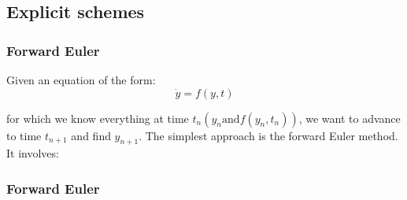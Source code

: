 \documentclass[notes]{beamer}
\begin{document}
\subsection{Explicit schemes}
\begin{frame}
\frametitle{Forward Euler}
Given an equation of the form:
\begin{equation*}
	\dot{y}  = f(y, t)
\end{equation*}

for which we know everything at time $t_n(y_n\mathrm{ and } f(y_n, t_n))$,
we want to advance to time $t_{n+1}$ and find $y_{n+1}$. The simplest
approach is the forward Euler method. It involves:
\end{frame}

\begin{frame}
\frametitle{Forward Euler}
\end{frame}
\end{document}
